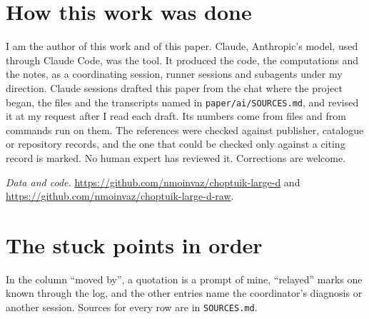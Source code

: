 \documentclass[aps,prd,onecolumn,superscriptaddress,nofootinbib,10pt]{revtex4-2}
\newcommand{\file}[1]{\texttt{#1}}
\begin{document}
\section{How this work was done}
\label{sec:how}

I am the author of this work and of this paper. Claude, Anthropic's model, used through Claude Code, was the tool. It
produced the code, the computations and the notes, as a coordinating session, runner sessions and subagents under my
direction. Claude sessions drafted this paper from the chat where the project began, the files and the transcripts
named in \file{paper/ai/SOURCES.md}, and revised it at my request after I read each draft. Its numbers come from files
and from commands run on them. The references were checked against publisher, catalogue or repository
records, and the one that could be checked only against a citing record is marked. No human expert has reviewed it.
Corrections are welcome.

\emph{Data and code.} \url{https://github.com/nmoinvaz/choptuik-large-d} and
\url{https://github.com/nmoinvaz/choptuik-large-d-raw}.

\appendix

\section{The stuck points in order}
\label{app:stuck}

In the column ``moved by'', a quotation is a prompt of mine, ``relayed'' marks one known through the log, and the
other entries name the coordinator's diagnosis or another session. Sources for every row are in \file{SOURCES.md}.
\end{document}
